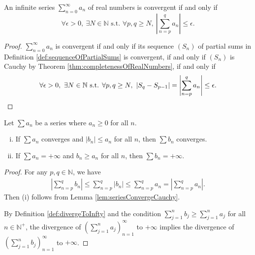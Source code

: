 \begin{lem}
  \label{lem:seriesConvergeCauchy}
  An infinite series $\sum_{n=0}^{\infty} a_n$ of real numbers
  is convergent if and only if
  \begin{equation}
    \label{eq:seriesConvergeCauchy}
    \forall \epsilon>0,\ \exists N\in \mathbb{N} \text{ s.t. }
    \forall p,q\ge N, \ \left|\sum_{n=p}^q a_n\right| \le \epsilon.
  \end{equation}
\end{lem}
\begin{proof}
  $\sum_{n=0}^{\infty}a_{n}$ is convergent if and only if
  its sequence $(S_{n})$ of partial sums
  in Definition \ref{def:sequenceOfPartialSums}
  is convergent, if and only if $(S_{n})$ is Cauchy
  by Theorem \ref{thm:completenessOfRealNumbers}, if and only if
  \begin{displaymath}
    \forall \epsilon>0,\ \exists N\in \mathbb{N} \text{ s.t. }
    \forall p,q\ge N, \ |S_{q}-S_{p-1}|
    =\left|\sum_{n=p}^q a_n\right| \le \epsilon. \qedhere
  \end{displaymath}
\end{proof}

\begin{thm}
  \label{thm:comparisonTest}
  Let $\sum a_n$ be a series where $a_n\ge 0$ for all $n$.
  \begin{enumerate}[(i)]\itemsep0em
  \item If $\sum a_n$ converges and $|b_n|\le a_n$ for all $n$,
    then $\sum b_n$ converges.
  \item If $\sum a_n=+\infty$ and $b_n \ge a_n$ for all $n$,
    then \mbox{$\sum b_n=+\infty$}.
  \end{enumerate}
\end{thm}
\begin{proof}
  For any $p,q\in\mathbb{N}$, we have
  \begin{displaymath}
    \begin{array}{l}
    \left| \sum_{n=p}^{q}b_{n} \right|
    \le  \sum_{n=p}^{q}|b_{n}| \le \sum_{n=p}^{q}a_{n}
    =\left| \sum_{n=p}^{q}a_{n} \right|.
    \end{array}
  \end{displaymath}
  Then (i) follows from Lemma \ref{lem:seriesConvergeCauchy}. 

  By Definition \ref{def:divergeToInfty}
  and the condition
  $\sum_{j=1}^{n}b_{j}\ge \sum_{j=1}^{n}a_{j}$ for all $n\in \mathbb{N}^+$,
  the divergence of $(\sum_{j=1}^{n}a_{j})_{n=1}^{\infty}$ to $+\infty$
  implies the divergence of
  $(\sum_{j=1}^{n}b_{j})_{n=1}^{\infty}$ to $+\infty$.
\end{proof}

